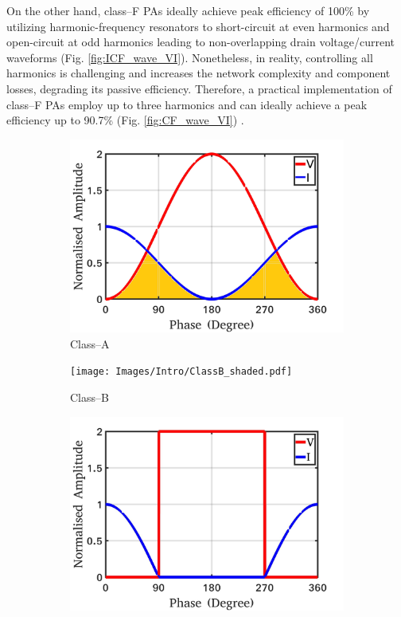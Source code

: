 \documentclass[conference]{IEEEtran}
\begin{document}
On the other hand, class--F PAs ideally achieve peak efficiency of 100\% by utilizing harmonic-frequency resonators to short-circuit at even harmonics and open-circuit at odd harmonics leading to non-overlapping drain voltage/current waveforms (Fig. \ref{fig:ICF_wave_VI}). Nonetheless, in reality, controlling all harmonics is challenging and increases the network complexity and component losses, degrading its passive efficiency. Therefore, a practical implementation of class--F PAs employ up to three harmonics and can ideally achieve a peak efficiency up to 90.7\% (Fig. \ref{fig:CF_wave_VI}) \cite{Raab_max_eff}.
\begin{figure}[!t]
\centering
\captionsetup{font=footnotesize}
\begin{subfigure}{0.24\textwidth}
\includegraphics[width=1\textwidth]{Images/Intro/ClassA_shaded.pdf}
\caption{Class--A}
\label{fig:CA_wave_VI}
\end{subfigure}
\begin{subfigure}{0.24\textwidth}
\texttt{[image: Images/Intro/ClassB\_shaded.pdf]}
\caption{Class--B}
\label{fig:CB_wave_VI}
\end{subfigure}
\begin{subfigure}{0.24\textwidth}
\includegraphics[width=1\textwidth]{Images/Intro/ClassF.pdf}

\end{subfigure}
\end{figure}
\end{document}

